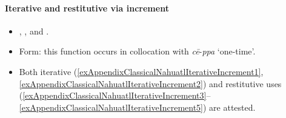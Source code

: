 \paragraph{Iterative and restitutive via increment}
\label{appendixClassicalNahuatlIterativeIncrement}
\begin{itemize}
		\item \textcite[473]{Andrews2003}, \textcite[247]{Bierhorst1985}, \textcite[175]{Karttunen1992} and \textcite[1265]{Launey1986}.
	\item Form: this function occurs in collocation with \textit{cē}-\textit{ppa} \lq one-time'.
	\item Both iterative (\ref{exAppendixClassicalNahuatlIterativeIncrement1}, \ref{exAppendixClassicalNahuatlIterativeIncrement2}) and restitutive uses (\ref{exAppendixClassicalNahuatlIterativeIncrement3}–\ref{exAppendixClassicalNahuatlIterativeIncrement5})  are attested.
\end{itemize}
